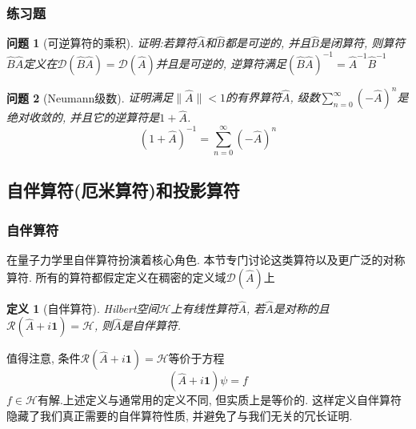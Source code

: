\documentclass[a4paper,11pt]{article}
\newtheorem{definition}{\hspace{2em}定义}[section]
\newtheorem{problem}{问题}[section]
\begin{document}
\subsubsection{练习题}
\begin{problem}[可逆算符的乘积]
  证明:若算符$\hat{A}$和$\hat{B}$都是可逆的, 并且$\hat{B}$是闭算符, 则算符$\hat{B}\hat{A}$定义在$\mathcal{D}(\hat{B}\hat{A})=\mathcal{D}(\hat{A})$并且是可逆的, 逆算符满足$(\hat{B}\hat{A})^{-1}=\hat{A}^{-1}\hat{B}^{-1}$
\end{problem}
\begin{problem}[Neumann级数]\label{Neumann series}
  证明满足$\|\hat{A}\|<1$的有界算符$\hat{A}$, 级数$\sum_{n=0}^{\infty}(-\hat{A})^n$是绝对收敛的, 并且它的逆算符是$1+\hat{A}$.
\begin{equation*}
  (1+\hat{A})^{-1}=\sum_{n=0}^{\infty}(-\hat{A})^n
\end{equation*}
\end{problem}
\subsection{自伴算符(厄米算符)和投影算符}
\subsubsection{自伴算符}
在量子力学里自伴算符扮演着核心角色. 本节专门讨论这类算符以及更广泛的对称算符. 所有的算符都假定定义在稠密的定义域$\mathcal{D}(\hat{A})$上
\begin{definition}[自伴算符]\label{Self-adjoint def 1}
  Hilbert空间$\mathcal{H}$上有线性算符$\hat{A}$, 若$\hat{A}$是对称的且$\mathcal{R}(\hat{A}+i\mathbf{1})=\mathcal{H}$, 则$\hat{A}$是自伴算符.
\end{definition}
值得注意, 条件$\mathcal{R}(\hat{A}+i\mathbf{1})=\mathcal{H}$等价于方程
\begin{equation*}
  (\hat{A}+i\mathbf{1})\psi=f
\end{equation*}
$f\in\mathcal{H}$有解.上述定义与通常用的定义不同, 但实质上是等价的. 这样定义自伴算符隐藏了我们真正需要的自伴算符性质, 并避免了与我们无关的冗长证明.
\end{document}
